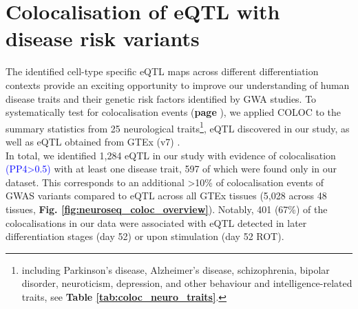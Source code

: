 




\clearpage

\section{Colocalisation of eQTL with disease risk variants}
\label{sec:neuroseq_coloc}

The identified cell-type specific eQTL maps across different differentiation contexts provide an exciting opportunity to improve our understanding of human disease traits and their genetic risk factors identified by GWA studies.
To systematically test for colocalisation events (\textbf{page \pageref{sec:eqtl_gwas}}), we applied COLOC \cite{giambartolomei2014bayesian} to the summary statistics from 25 neurological traits\footnote{including Parkinson's disease, Alzheimer's disease, schizophrenia, bipolar disorder, neuroticism, depression, and other behaviour and intelligence-related traits, see \textbf{Table \ref{tab:coloc_neuro_traits}}.}, eQTL discovered in our study, as well as eQTL obtained from GTEx (v7) \cite{gtex2017genetic}.\\

In total, we identified 1,284 eQTL in our study with evidence of colocalisation \textcolor{blue}{(PP4>0.5)} with at least one disease trait, 597 of which were found only in our dataset. 
This corresponds to an additional >10\% of colocalisation events of GWAS variants compared to eQTL across all GTEx tissues (5,028 across 48 tissues, \textbf{Fig. \ref{fig:neuroseq_coloc_overview}}). 
Notably, 401 (67\%) of the colocalisations in our data were associated with eQTL detected in later differentiation stages (day 52) or upon stimulation (day 52 ROT).\\

